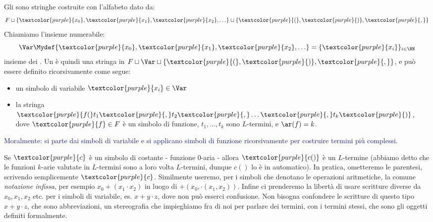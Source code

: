\begin{definition}
    [$L$-termine]
    Gli  sono stringhe costruite con l'alfabeto dato da:
    \[ F \sqcup \{\textcolor{purple}{x_0},\textcolor{purple}{x_1},\textcolor{purple}{x_2}, \ldots\} \sqcup \{\textcolor{purple}{(}, \textcolor{purple}{)}, \textcolor{purple}{,}\}
    \]
    Chiamiamo l'insieme numerabile:
    \[ \Var\Mydef \{\textcolor{purple}{x_0},\textcolor{purple}{x_1},\textcolor{purple}{x_2}, \ldots\} = \{\textcolor{purple}{x_i}\}_{i \in \NN}
    \]
    insieme dei . Un  è quindi una stringa in $F \sqcup \Var\sqcup \{\textcolor{purple}{(}, \textcolor{purple}{)}, \textcolor{purple}{,}\}$, e può essere definito ricorsivamente come segue:
    \begin{itemize}
        \item un simbolo di variabile $\textcolor{purple}{x_i} \in \Var$
        \item la stringa $\textcolor{purple}{f(}t_1\textcolor{purple}{,}t_2\textcolor{purple}{,} \ldots\textcolor{purple}{,} t_k\textcolor{purple}{)}$, dove $\textcolor{purple}{f} \in F$ è un simbolo di funzione, $t_1,\ldots,t_k$ sono $L$-termini, e $\ar(f) = k$.
    \end{itemize}
\end{definition}

\textcolor{MidnightBlue}{Moralmente: si parte dai simboli di variabile e si applicano simboli di funzione ricorsivamente per costruire termini più complessi.}

\begin{remark}
    Se $\textcolor{purple}{c}$ è un simbolo di costante - funzione 0-aria - allora $\textcolor{purple}{c()}$ è un $L$-termine (abbiamo detto che le funzioni $k$-arie valutate in $L$-termini sono a loro volta $L$-termini, dunque $c()$ lo è in automatico).
    In pratica, ometteremo le parentesi, scrivendo semplicemente $\textcolor{purple}{c}$.
    Similmente useremo, per i simboli che denotano le operazioni aritmetiche, la comune \emph{notazione infissa}, per esempio $x_0 + (x_1 \cdot x_2)$ in luogo di $+(x_0, \cdot(x_1,x_2))$.
    Infine ci prenderemo la libertà di usare scritture diverse da $x_0,x_1,x_2$ etc. per i simboli di variabile, es. $x+y\cdot z$, dove non può esserci confusione.
    Non bisogna confondere le scritture di questo tipo $x+y\cdot z$, che sono abbreviazioni, un stereografia che impieghiamo fra di noi per parlare dei termini, con i termini stessi, che sono gli oggetti definiti formalmente.
\end{remark}

